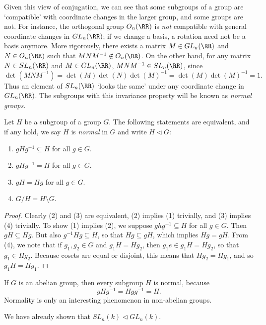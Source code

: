 Given this view of conjugation, we can see that some subgroups of a group are `compatible' with coordinate changes in the larger group, and some groups are not. For instance, the orthogonal group $O_n(\RR)$ is \emph{not} compatible with general coordinate changes in $GL_n(\RR)$; if we change a basis, a rotation need not be a basis anymore. More rigorously, there exists a matrix $M \in GL_n(\RR)$ and $N \in O_n(\RR)$ such that $MNM^{-1} \not \in O_n(\RR)$. On the other hand, for any matrix $N \in SL_n(\RR)$ and $M \in GL_n(\RR)$, $MNM^{-1} \in SL_n(\RR)$, since
%
\[ \det(MNM^{-1}) = \det(M) \det(N) \det(M)^{-1} = \det(M) \det(M)^{-1} = 1. \] 
%
Thus an element of $SL_n(\RR)$ `looks the same' under any coordinate change in $GL_n(\RR)$. The subgroups with this invariance property will be known as \emph{normal groups}.

\begin{theorem}
Let $H$ be a subgroup of a group $G$. The following statements are equivalent, and if any hold, we say $H$ is \emph{normal} in $G$ and write $H \lhd G$:
\begin{enumerate}
    \item $gHg^{-1} \subseteq H$ for all $g \in G$.
    \item $gHg^{-1} = H$ for all $g \in G$.
    \item $gH = Hg$ for all $g \in G$.
    \item $G/H = H \setminus G$.
\end{enumerate}
\end{theorem}
\begin{proof}
    Clearly (2) and (3) are equivalent, (2) implies (1) trivially, and (3) implies (4) trivially. To show (1) implies (2), we suppose $ghg^{-1} \subseteq H$ for all $g \in G$. Then $gH \subseteq Hg$. But also $g^{-1}Hg \subseteq H$, so that $Hg \subseteq gH$, which implies $Hg = gH$. From (4), we note that if $g_1, g_2 \in G$ and $g_1H = Hg_2$, then $g_1e \in g_1H = Hg_2$, so that $g_1 \in Hg_2$. Because cosets are equal or disjoint, this means that $Hg_2 = Hg_1$, and so $g_1H = Hg_1$.
\end{proof}

If $G$ is an abelian group, then every subgroup $H$ is normal, because
%
\[ gHg^{-1} = Hgg^{-1} = H. \]
%
Normality is only an interesting phenomenon in non-abelian groups.

\begin{example}
    We have already shown that $SL_n(k) \lhd GL_n(k)$.
\end{example}

